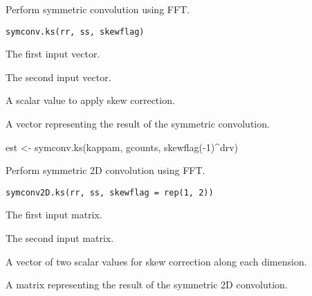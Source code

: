 \documentclass[a4paper]{book}
\begin{document}
%
\begin{Description}\relax
Perform symmetric convolution using FFT.
\end{Description}
%
\begin{Usage}
\begin{verbatim}
symconv.ks(rr, ss, skewflag)
\end{verbatim}
\end{Usage}
%
\begin{Arguments}
\begin{ldescription}
\item[\code{rr}] The first input vector.

\item[\code{ss}] The second input vector.

\item[\code{skewflag}] A scalar value to apply skew correction.
\end{ldescription}
\end{Arguments}
%
\begin{Value}
A vector representing the result of the symmetric convolution.
\end{Value}
%
\begin{Examples}
\begin{ExampleCode}
est <- symconv.ks(kappam, gcounts, skewflag(-1)^drv)
\end{ExampleCode}
\end{Examples}
%
\begin{Description}\relax
Perform symmetric 2D convolution using FFT.
\end{Description}
%
\begin{Usage}
\begin{verbatim}
symconv2D.ks(rr, ss, skewflag = rep(1, 2))
\end{verbatim}
\end{Usage}
%
\begin{Arguments}
\begin{ldescription}
\item[\code{rr}] The first input matrix.

\item[\code{ss}] The second input matrix.

\item[\code{skewflag}] A vector of two scalar values for skew correction along each dimension.
\end{ldescription}
\end{Arguments}
%
\begin{Value}
A matrix representing the result of the symmetric 2D convolution.
\end{Value}
\end{document}
